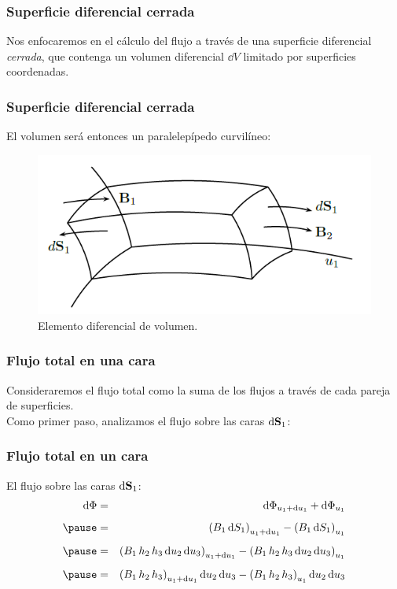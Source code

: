 \documentclass[12pt]{beamer}
\begin{document}
\begin{frame}
\frametitle{Superficie diferencial cerrada}
Nos enfocaremos en el cálculo del flujo a través de una superficie diferencial \emph{cerrada}, que contenga un volumen diferencial $\dd{V}$ limitado por superficies coordenadas.
\end{frame}
\begin{frame}
\frametitle{Superficie diferencial cerrada}
El volumen será entonces un paralelepípedo curvilíneo:
\begin{figure}[h!]
    \centering
    \includegraphics[scale=0.5]{Imagenes/Diferencial_Volumen.png}
    \caption{Elemento diferencial de volumen.}
    \label{fig:Diferencial_Volumen}
\end{figure}
\end{frame}
\begin{frame}
\frametitle{Flujo total en una cara}
Consideraremos el flujo total como la suma de los flujos a través de cada pareja de superficies.
\\
\bigskip
\pause
Como primer paso, analizamos el flujo sobre las caras $\dd{\vb{S}_{1}}$:
\end{frame}
\begin{frame}
\frametitle{Flujo total en un cara}
El flujo sobre las caras $\dd{\vb{S}_{1}}$:
\pause
\begin{eqnarray*}
\dd{\Phi} &=& \dd{\Phi_{u_{1} + \dd{u_{1}}}} + \dd{\Phi_{u_{1}}} \\[0.5em] \pause
&=& \left( B_{1} \dd{S_{1}} \right)_{u_{1} + \dd{u_{1}}} - \left( B_{1} \dd{S_{1}} \right)_{u_{1}} \\[0.5em] \pause
&=& \left( B_{1} \, h_{2} \, h_{3} \dd{u_{2}} \dd{u_{3}} \right)_{u_{1} + \dd{u_{1}}} - \left( B_{1} \, h_{2} \, h_{3} \dd{u_{2}} \dd{u_{3}} \right)_{u_{1}} \\[0.5em] \pause
&=& \left( B_{1} \, h_{2} \, h_{3} \right)_{u_{1} + \dd{u_{1}}} \dd{u_{2}} \dd{u_{3}} - \left( B_{1} \, h_{2} \, h_{3} \right)_{u_{1}} \dd{u_{2}} \dd{u_{3}}
\end{eqnarray*}
\end{frame} 
\end{document}
